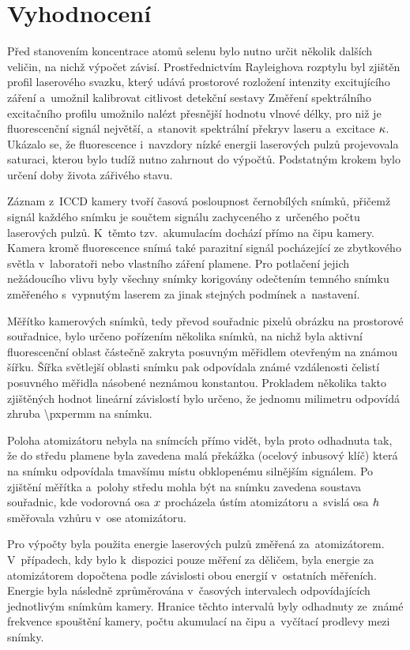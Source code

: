 \section{Vyhodnocení}
\label{sec:lif-method}

Před stanovením koncentrace atomů selenu bylo nutno určit několik
dalších veličin, na nichž výpočet závisí.
Prostřednictvím Rayleighova rozptylu byl zjištěn profil laserového svazku,
který udává prostorové rozložení intenzity excitujícího záření
a~umožnil kalibrovat citlivost detekční sestavy
Změření spektrálního excitačního profilu umožnilo nalézt přesnější
hodnotu vlnové délky, pro niž je fluorescenční signál největší,
a~stanovit spektrální překryv laseru a~excitace $\kappa$.
Ukázalo se, že fluorescence i~navzdory nízké energii laserových pulzů
projevovala saturaci, kterou bylo tudíž nutno zahrnout do výpočtů.
Podstatným krokem bylo určení doby života zářivého stavu.

Záznam z~ICCD kamery tvoří časová posloupnost černobílých sním\-ků,
přičemž signál každého snímku je součtem signálu zachyceného
z~určeného počtu laserových pulzů.
K~těmto tzv.~akumulacím dochází přímo na čipu kamery.
Kamera kromě fluorescence snímá také parazitní signál pocházející
ze zbytkového světla v~laboratoři nebo vlastního záření plamene.
Pro potlačení jejich nežádoucího vlivu
byly všechny snímky korigovány odečtením temného snímku změřeného
s~vypnutým laserem za jinak stejných podmínek a~nastavení.

Měřítko kamerových snímků, tedy převod souřadnic pixelů obrázku
na prostorové souřadnice, bylo určeno pořízením několika snímků,
na nichž byla aktivní fluorescenční oblast částečně zakryta posuvným
měřidlem otevřeným na známou šířku.
Šířka světlejší oblasti snímku pak odpovídala známé vzdálenosti čelistí
posuvného měřidla násobené neznámou konstantou.
Prokladem několika takto zjištěných hodnot lineární závislostí
bylo určeno, že jednomu milimetru odpovídá zhruba
\SI[round-mode=places,round-precision=1]{\pxpermm}{\pixel} na snímku.

Poloha atomizátoru nebyla na snímcích přímo vidět, byla proto odhadnuta tak,
že do středu plamene byla zavedena malá překážka (ocelový inbusový klíč)
která na snímku odpovídala tmavšímu místu obklopenému silnějším signálem.
Po zjištění měřítka a~polohy středu mohla být na snímku zavedena soustava
souřadnic, kde vodorovná osa $x$ procházela ústím atomizátoru
a~svislá osa $h$ směřovala vzhůru v~ose atomizátoru.

Pro výpočty byla použita energie laserových pulzů změřená za~atomizátorem.
V~případech, kdy bylo k~dispozici pouze měření za děličem,
byla energie za atomizátorem dopočtena podle závislosti obou energií
v~ostatních měřeních.
Energie byla následně zprůměrována v~časových intervalech odpovídajících
jednotlivým snímkům kamery.
Hranice těchto intervalů byly odhadnuty ze~známé frekvence spouštění
kamery, počtu akumulací na čipu a~vyčítací prodlevy mezi sním\-ky.

